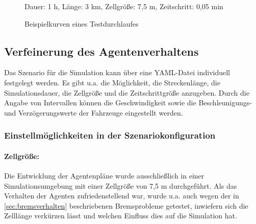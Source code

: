 \begin{figure}[hptb]
  \centering 
   \qquad
  \caption{Beispielkurven eines Testdurchlaufes}{\footnotesize Dauer: 1 h, Länge: 3 km, Zellgröße: 7,5 m, Zeitschritt: 0,05 min} 
  \label{figure:test-cell-speedcurves}
\end{figure}






\subsection{Verfeinerung des Agentenverhaltens}
\label{sec:verfeinerung-agentenplan}

Das Szenario für die Simulation kann über eine YAML-Datei individuell festgelegt werden.
Es gibt u.a. die Möglichkeit, die Streckenlänge, die Simulationsdauer, die Zellgröße und die Zeitschrittgröße anzugeben. 
Durch die Angabe von Intervallen können die Geschwindigkeit sowie die Beschleunigungs- und Verzögerungswerte der Fahrzeuge eingestellt werden.



\subsubsection{Einstellmöglichkeiten in der Szenariokonfiguration}
\label{einstellungen-szenario}


\paragraph*{Zellgröße:}
\label{zellgroesse-zeitschritte}
Die Entwicklung der Agentenpläne wurde ausschließlich in einer Simulationsumgebung mit einer Zellgröße von 7,5 m durchgeführt.
Als das Verhalten der Agenten zufriedenstellend war, wurde u.a. auch wegen der in \cref{sec:bremsverhalten} beschriebenen Bremsprobleme getestet, inwiefern sich die Zelllänge verkürzen lässt und welchen Einfluss dies auf die Simulation hat.

